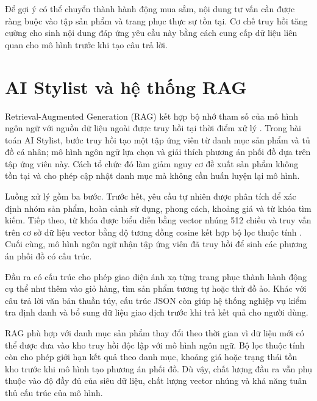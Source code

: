 \medskip

Để gợi ý có thể chuyển thành hành động mua sắm, nội dung tư vấn cần được ràng buộc vào tập sản phẩm và trang phục thực sự tồn tại. Cơ chế truy hồi tăng cường cho sinh nội dung đáp ứng yêu cầu này bằng cách cung cấp dữ liệu liên quan cho mô hình trước khi tạo câu trả lời.

\section{AI Stylist và hệ thống RAG}

Retrieval-Augmented Generation (RAG) kết hợp bộ nhớ tham số của mô hình ngôn ngữ với nguồn dữ liệu ngoài được truy hồi tại thời điểm xử lý \cite{rag}. Trong bài toán AI Stylist, bước truy hồi tạo một tập ứng viên từ danh mục sản phẩm và tủ đồ cá nhân; mô hình ngôn ngữ lựa chọn và giải thích phương án phối đồ dựa trên tập ứng viên này. Cách tổ chức đó làm giảm nguy cơ đề xuất sản phẩm không tồn tại và cho phép cập nhật danh mục mà không cần huấn luyện lại mô hình.

\medskip

Luồng xử lý gồm ba bước. Trước hết, yêu cầu tự nhiên được phân tích để xác định nhóm sản phẩm, hoàn cảnh sử dụng, phong cách, khoảng giá và từ khóa tìm kiếm. Tiếp theo, từ khóa được biểu diễn bằng vector nhúng 512 chiều và truy vấn trên cơ sở dữ liệu vector bằng độ tương đồng cosine kết hợp bộ lọc thuộc tính \cite{sentence-transformers,lancedb}. Cuối cùng, mô hình ngôn ngữ nhận tập ứng viên đã truy hồi để sinh các phương án phối đồ có cấu trúc.

\medskip

Đầu ra có cấu trúc cho phép giao diện ánh xạ từng trang phục thành hành động cụ thể như thêm vào giỏ hàng, tìm sản phẩm tương tự hoặc thử đồ ảo. Khác với câu trả lời văn bản thuần túy, cấu trúc JSON còn giúp hệ thống nghiệp vụ kiểm tra định danh và bổ sung dữ liệu giao dịch trước khi trả kết quả cho người dùng.

\medskip

RAG phù hợp với danh mục sản phẩm thay đổi theo thời gian vì dữ liệu mới có thể được đưa vào kho truy hồi độc lập với mô hình ngôn ngữ. Bộ lọc thuộc tính còn cho phép giới hạn kết quả theo danh mục, khoảng giá hoặc trạng thái tồn kho trước khi mô hình tạo phương án phối đồ. Dù vậy, chất lượng đầu ra vẫn phụ thuộc vào độ đầy đủ của siêu dữ liệu, chất lượng vector nhúng và khả năng tuân thủ cấu trúc của mô hình.

\medskip

